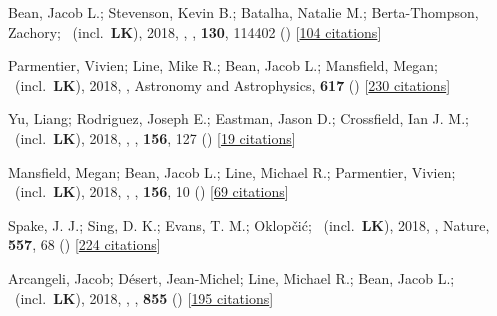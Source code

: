 \item[{\color{numcolor}\scriptsize23}] Bean, Jacob L.; Stevenson, Kevin B.; Batalha, Natalie M.; Berta-Thompson, Zachory; \etal\ (incl.\ \textbf{LK}), 2018, , \pasp, \textbf{130}, 114402 () [\href{https://ui.adsabs.harvard.edu/abs/2018PASP..130k4402B}{104 citations}]

\item[{\color{numcolor}\scriptsize22}] Parmentier, Vivien; Line, Mike R.; Bean, Jacob L.; Mansfield, Megan; \etal\ (incl.\ \textbf{LK}), 2018, , Astronomy and Astrophysics, \textbf{617} () [\href{https://ui.adsabs.harvard.edu/abs/2018A&A...617A.110P}{230 citations}]

\item[{\color{numcolor}\scriptsize21}] Yu, Liang; Rodriguez, Joseph E.; Eastman, Jason D.; Crossfield, Ian J. M.; \etal\ (incl.\ \textbf{LK}), 2018, , \aj, \textbf{156}, 127 () [\href{https://ui.adsabs.harvard.edu/abs/2018AJ....156..127Y}{19 citations}]

\item[{\color{numcolor}\scriptsize20}] Mansfield, Megan; Bean, Jacob L.; Line, Michael R.; Parmentier, Vivien; \etal\ (incl.\ \textbf{LK}), 2018, , \aj, \textbf{156}, 10 () [\href{https://ui.adsabs.harvard.edu/abs/2018AJ....156...10M}{69 citations}]

\item[{\color{numcolor}\scriptsize19}] Spake, J. J.; Sing, D. K.; Evans, T. M.; Oklop{\v{c}}i{\'c}; \etal\ (incl.\ \textbf{LK}), 2018, , Nature, \textbf{557}, 68 () [\href{https://ui.adsabs.harvard.edu/abs/2018Natur.557...68S}{224 citations}]

\item[{\color{numcolor}\scriptsize18}] Arcangeli, Jacob; D{\'e}sert, Jean-Michel; Line, Michael R.; Bean, Jacob L.; \etal\ (incl.\ \textbf{LK}), 2018, , \apj, \textbf{855} () [\href{https://ui.adsabs.harvard.edu/abs/2018ApJ...855L..30A}{195 citations}]

